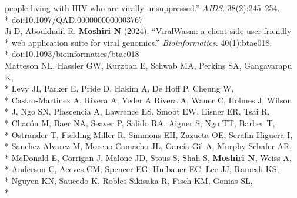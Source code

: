 \documentclass[margin,line]{res}
\begin{document}
\begin{resume}
\hspace*{9.5mm} people living with HIV who are virally unsuppressed.'' \textit{AIDS}. 38(2):245--254.\\*\vspace{2mm}
\hspace*{8mm} \href{https://doi.org/10.1097/QAD.0000000000003767}{doi:10.1097/QAD.0000000000003767}\\
\hspace*{4mm} Ji D, Aboukhalil R, \textbf{Moshiri N} (2024). ``ViralWasm: a client-side user-friendly\\*
\hspace*{9.5mm} web application suite for viral genomics.'' \textit{Bioinformatics}. 40(1):btae018.\\*\vspace{2mm}
\hspace*{8mm} \href{https://doi.org/10.1093/bioinformatics/btae018}{doi:10.1093/bioinformatics/btae018}\\
\hspace*{4mm} Matteson NL, Hassler GW, Kurzban E, Schwab MA, Perkins SA, Gangavarapu K,\\*
\hspace*{9.5mm} Levy JI, Parker E, Pride D, Hakim A, De Hoff P, Cheung W,\\*
\hspace*{9.5mm} Castro-Martinez A, Rivera A, Veder A Rivera A, Wauer C, Holmes J, Wilson\\*
\hspace*{9.5mm} J, Ngo SN, Plascencia A, Lawrence ES, Smoot EW, Eisner ER, Tsai R,\\*
\hspace*{9.5mm} Chac\'{o}n M, Baer NA, Seaver P, Salido RA, Aigner S, Ngo TT, Barber T,\\*
\hspace*{9.5mm} Ostrander T, Fielding-Miller R, Simmons EH, Zazueta OE, Serafin-Higuera I,\\*
\hspace*{9.5mm} Sanchez-Alvarez M, Moreno-Camacho JL, García-Gil A, Murphy Schafer AR,\\*
\hspace*{9.5mm} McDonald E, Corrigan J, Malone JD, Stous S, Shah S, \textbf{Moshiri N}, Weiss A,\\*
\hspace*{9.5mm} Anderson C, Aceves CM, Spencer EG, Hufbauer EC, Lee JJ, Ramesh KS,\\*
\hspace*{9.5mm} Nguyen KN, Saucedo K, Robles-Sikisaka R, Fisch KM, Gonias SL,\\*

\end{resume}
\end{document}
